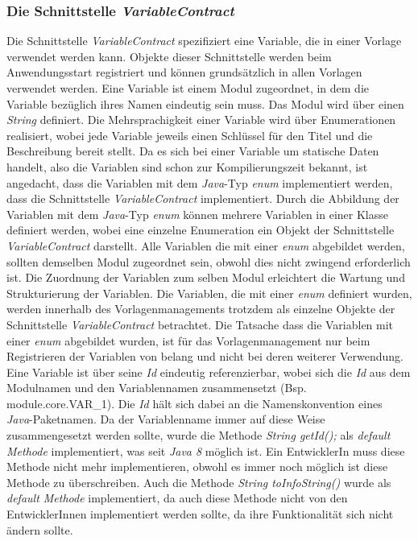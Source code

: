 \subsubsection{Die Schnittstelle \emph{VariableContract}}
\label{sec:variableContract}
Die Schnittstelle \emph{VariableContract} spezifiziert eine Variable, die in einer Vorlage verwendet werden kann. Objekte dieser Schnittstelle werden beim Anwendungsstart registriert und können grundsätzlich in allen Vorlagen verwendet werden. Eine Variable ist einem Modul zugeordnet, in dem die Variable bezüglich ihres Namen eindeutig sein muss. Das Modul wird über einen \emph{String} definiert. Die Mehrsprachigkeit einer Variable wird über Enumerationen realisiert, wobei jede Variable jeweils einen Schlüssel für den Titel und die Beschreibung bereit stellt. 
\newline
\newline
Da es sich bei einer Variable um statische Daten handelt, also die Variablen sind schon zur Kompilierungszeit bekannt, ist angedacht, dass die Variablen mit dem \emph{Java}-Typ \emph{enum} implementiert werden, dass die Schnittstelle \emph{VariableContract} implementiert. Durch die Abbildung der Variablen mit dem \emph{Java}-Typ \emph{enum} können mehrere Variablen in einer Klasse definiert werden, wobei eine einzelne Enumeration ein Objekt der Schnittstelle \emph{VariableContract} darstellt. Alle Variablen die mit einer \emph{enum} abgebildet werden, sollten demselben Modul zugeordnet sein, obwohl dies nicht zwingend erforderlich ist. Die Zuordnung der Variablen zum selben Modul erleichtert die Wartung und Strukturierung der Variablen. Die Variablen, die mit einer \emph{enum} definiert wurden, werden innerhalb des Vorlagenmanagements trotzdem als einzelne Objekte der Schnittstelle \emph{VariableContract} betrachtet. Die Tatsache dass die Variablen mit einer \emph{enum} abgebildet wurden, ist für das Vorlagenmanagement nur beim Registrieren der Variablen von belang und nicht bei deren weiterer Verwendung.
\newline
\newline
Eine Variable ist über seine \emph{Id} eindeutig referenzierbar, wobei sich die \emph{Id} aus dem Modulnamen und den Variablennamen zusammensetzt (Bsp. module.core.VAR\_1). Die \emph{Id} hält sich dabei an die Namenskonvention eines \emph{Java}-Paketnamen. Da der Variablenname immer auf diese Weise zusammengesetzt werden sollte, wurde die Methode \emph{String getId();} als \emph{default Methode} implementiert, was seit \emph{Java 8} möglich ist. Ein EntwicklerIn muss diese Methode nicht mehr implementieren, obwohl es immer noch möglich ist diese Methode zu überschreiben. Auch die Methode \emph{String toInfoString()} wurde als \emph{default Methode} implementiert, da auch diese Methode nicht von den EntwicklerInnen implementiert werden sollte, da ihre Funktionalität sich nicht ändern sollte.
\newpage

